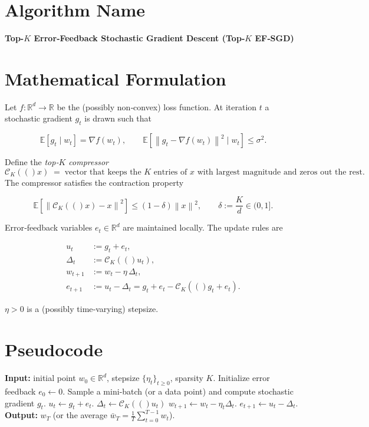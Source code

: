 \documentclass[11pt]{article}
\newcommand{\E}{\mathbb{E}}
\newcommand{\R}{\mathbb{R}}
\newcommand{\norm}[1]{\left\|#1\right\|}
\newcommand{\cK}[1]{\mathcal{C}_K(#1)}   %
\newcommand{\grad}{\nabla}
\begin{document}
\section*{Algorithm Name}
\textbf{Top-$K$ Error‑Feedback Stochastic Gradient Descent (Top‑$K$ EF‑SGD)}

\section*{Mathematical Formulation}
Let $f:\R^{d}\rightarrow\R$ be the (possibly non‑convex) loss function.  
At iteration $t$ a stochastic gradient $g_t$ is drawn such that  

\[
\E\!\left[g_t\mid w_t\right]=\grad f(w_t),\qquad 
\E\!\left[\norm{g_t-\grad f(w_t)}^{2}\mid w_t\right]\le\sigma^{2}.
\]

Define the \emph{top‑$K$ compressor}
\[
\cK(x)\;=\;\text{vector that keeps the $K$ entries of $x$ with largest magnitude and zeros out the rest.}
\]
The compressor satisfies the contraction property  

\[
\E\!\left[\norm{\cK(x)-x}^{2}\right]\le(1-\delta)\norm{x}^{2},
\qquad\delta:=\frac{K}{d}\in(0,1].
\tag{1}
\]

Error‑feedback variables $e_t\in\R^{d}$ are maintained locally.  
The update rules are  

\[
\boxed{
\begin{aligned}
u_t &:= g_t+e_t,\\[2mm]
\Delta_t &:= \cK(u_t),\\[2mm]
w_{t+1} &:= w_t-\eta\,\Delta_t,\\[2mm]
e_{t+1} &:= u_t-\Delta_t = g_t+e_t-\cK(g_t+e_t).
\end{aligned}}
\tag{2}
\]

$\eta>0$ is a (possibly time‑varying) stepsize.  

\section*{Pseudocode}
\begin{algorithm}[H]
\caption{Top‑$K$ EF‑SGD}
\begin{algorithmic}[1]
\State \textbf{Input:} initial point $w_{0}\in\R^{d}$, stepsize $\{\eta_t\}_{t\ge0}$, sparsity $K$.
\State Initialize error feedback $e_{0}\gets 0$.
    \State Sample a mini‑batch (or a data point) and compute stochastic gradient $g_t$.
    \State $u_t \gets g_t+e_t$.
    \State $\Delta_t \gets \cK(u_t)$ 
    \State $w_{t+1} \gets w_t - \eta_t \Delta_t$.
    \State $e_{t+1} \gets u_t-\Delta_t$.
\EndFor
\State \textbf{Output:} $w_T$ (or the average $\bar w_T = \frac1T\sum_{t=0}^{T-1}w_t$).
\end{algorithmic}
\end{algorithm}
\end{document}
